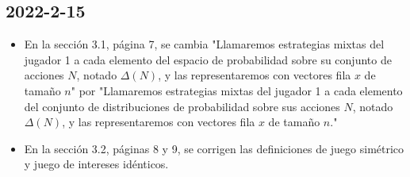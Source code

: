 \documentclass{article}
\begin{document}
\subsection*{2022-2-15}
\begin{itemize}
    \item En la sección 3.1, página 7, se cambia "Llamaremos estrategias mixtas del jugador 1 a cada elemento del espacio de probabilidad sobre su conjunto de acciones $N$, notado $\Delta(N)$, y las representaremos con vectores fila $x$ de tamaño $n$" por "Llamaremos estrategias mixtas del jugador 1 a cada elemento del conjunto de distribuciones de probabilidad sobre sus acciones $N$, notado $\Delta(N)$, y las representaremos con vectores fila $x$ de tamaño $n$."
    \item En la sección 3.2, páginas 8 y 9, se corrigen las definiciones de juego simétrico y juego de intereses idénticos.
\end{itemize}
\end{document}

